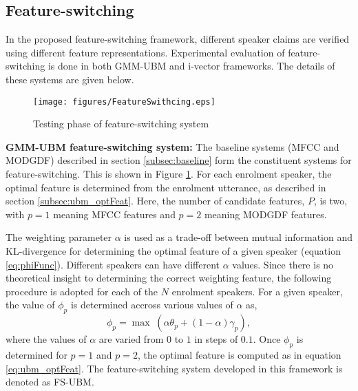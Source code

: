 \documentclass{article}
\begin{document}
	
\subsection{Feature-switching}
\label{subsec:featSwitch}

In the proposed feature-switching framework, different speaker
claims are verified using different feature representations. 
Experimental evaluation of feature-switching is done in both
GMM-UBM and i-vector frameworks. The details of these systems
are given below.

\begin{figure}[h]
\texttt{[image: figures/FeatureSwithcing.eps]}
\caption{Testing phase of feature-switching system}
\label{fig:systemArch2}
\end{figure}


\textbf{GMM-UBM feature-switching system:}
The baseline systems (MFCC and MODGDF) described in section
\ref{subsec:baseline} form the constituent systems for feature-switching. This
is shown in Figure \ref{fig:systemArch2}. For each enrolment speaker, the
optimal feature is determined from the enrolment utterance, as described in
section \ref{subsec:ubm_optFeat}. Here, the number of candidate features, $P$,
is two, with $p=1$ meaning MFCC features and $p=2$ meaning MODGDF features.

The weighting parameter $\alpha$ is used as a trade-off between mutual information and
KL-divergence for determining the optimal feature of a given speaker (equation
\ref{eq:phiFunc}). Different speakers can have different $\alpha$ values. Since
there is no theoretical insight to determining the correct weighting feature,
the following procedure is adopted for each of the $N$ enrolment speakers.
For a given speaker, the value of $\phi_p$ is determined accross various values
of $\alpha$ as, 
\begin{equation}
\phi_p = \max \; (\alpha \theta_p + (1-\alpha) \gamma_p),
\end{equation}
where the values of $\alpha$ are varied from $0$ to $1$ in steps of $0.1$. Once
$\phi_p$ is determined for $p=1$ and $p=2$, the optimal feature is computed as in equation
\ref{eq:ubm_optFeat}.
The feature-switching system developed in this framework is denoted as
FS-UBM. 
\end{document}
